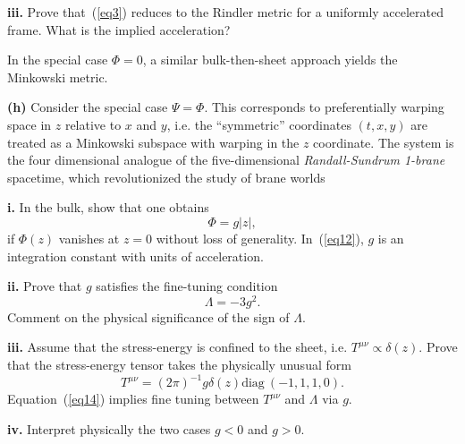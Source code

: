 \documentclass[a4paper]{article} %
\newcommand{\diag}{\text{diag}~}
\begin{document}
\begin{framed}
\textbf{iii.} Prove that~(\ref{eq3}) reduces to the Rindler metric for a uniformly accelerated frame.
What is the implied acceleration?

In the special case $\Phi = 0$, a similar bulk-then-sheet approach yields the Minkowski
metric.
\end{framed}

\begin{framed}
\textbf{(h)} Consider the special case $\Psi=\Phi$. This corresponds to preferentially warping space in $z$ relative to $x$ and $y$, i.e. the ``symmetric'' coordinates $(t, x, y)$ are treated as a Minkowski subspace with warping in the $z$ coordinate. The system is the four dimensional analogue of the five-dimensional \emph{Randall-Sundrum 1-brane} spacetime, which revolutionized the study of brane worlds 
\end{framed}

\begin{framed}
\textbf{i.} In the bulk, show that one obtains
\begin{equation}
\Phi=g |z|,\label{eq12}
\end{equation}
if $\Phi(z)$ vanishes at $z = 0$ without loss of generality. In~(\ref{eq12}), $g$ is an integration
constant with units of acceleration.
\end{framed}

\begin{framed}
\textbf{ii.} Prove that $g$ satisfies the fine-tuning condition
\begin{equation}
\Lambda=-3g^2.\label{eq13}
\end{equation}
Comment on the physical significance of the sign of $\Lambda$.
\end{framed}

\begin{framed}
\textbf{iii.} Assume that the stress-energy is confined to the sheet, i.e. $T^{\mu\nu}\propto \delta(z)$. Prove that the stress-energy tensor takes the physically unusual form
\begin{equation}
T^{\mu\nu}=(2\pi)^{-1}g\delta(z)\diag(-1,1,1,0).\label{eq14}
\end{equation}
Equation~(\ref{eq14}) implies fine tuning between $T^{\mu\nu}$ and $\Lambda$ via $g$.
\end{framed}

\begin{framed}
\textbf{iv.} Interpret physically the two cases $g < 0$ and $g > 0$.
\end{framed}
\end{document}
